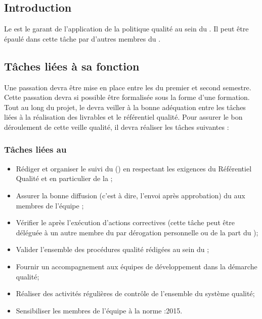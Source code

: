 
\subsection*{Introduction}

Le \RQ{} est le garant de l’application de la politique qualité au sein du \PICCourt. Il peut être épaulé dans cette tâche par d’autres membres du \PICCourt.

\subsection*{Tâches liées à sa fonction}

Une passation devra être mise en place entre les \RQs{} du premier et second semestre. Cette passation devra si possible être formalisée sous la forme d’une formation.\\
Tout au long du projet, le \RQ{} devra veiller à la bonne adéquation entre les tâches liées à la réalisation des livrables et le référentiel qualité. Pour assurer le bon déroulement de cette veille qualité, il devra réaliser les tâches suivantes :

\subsubsection*{Tâches liées au \PQCourt}
\begin{itemize}

	\item Rédiger et organiser le suivi du \PQ (\PQCourt) en respectant les exigences du Référentiel Qualité et en particulier de la \DGQDEUXCourt;
	\item Assurer la bonne diffusion (c’est à dire, l’envoi après approbation) du \PQCourt{} aux membres de l’équipe \PICCourt;
	\item Vérifier le \PQCourt{} après l’exécution d’actions correctives (cette tâche peut être déléguée à un autre membre du \PICCourt par dérogation personnelle ou de la part du \CP);


	\item Valider l’ensemble des procédures qualité rédigées au sein du \PICCourt;
	\item Fournir un accompagnement aux équipes de développement dans la démarche qualité;
	\item Réaliser des activités régulières de contrôle de l’ensemble du système qualité;
	\item Sensibiliser les membres de l’équipe \PICCourt{} à la norme :2015.
\end{itemize}

